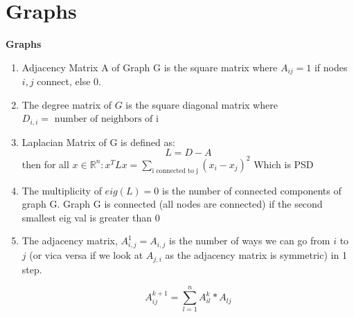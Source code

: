 \documentclass[12pt,twoside]{article}
\newcommand{\R}{\mathbb{R}}
\begin{document}
\section*{Graphs}
\textbf{Graphs}
\begin{enumerate}
    \item Adjacency Matrix A of Graph G is the square matrix where $A_{ij} = 1$ if nodes $i,j$ connect, else 0.
    \item The degree matrix of $G$ is the square diagonal matrix where $D_{i,i}=\text{ number of neighbors of i}$
    \item Laplacian Matrix of G is defined as:
    $$
        L = D-A
    $$
    then for all $x\in \R^n: x^TLx = \sum_{\text{i connected to j}} (x_i-x_j)^2$ Which is PSD
    \item The multiplicity of $eig(L)=0$ is the number of connected components of graph G. Graph G is connected (all nodes are connected) if the second smallest eig val is greater than 0
    \item The adjacency matrix, $A_{i,j}^1=A_{i,j}$ is the number of ways we can go from $i$ to $j$ (or vica versa if we look at $A_{j,i}$ as the adjacency matrix is symmetric) in 1 step.
    
    $$A^{k+1}_{ij} = \sum\limits^n_{l=1}A^{k}_{il}*A_{lj}  $$
\end{enumerate}
\end{document}

